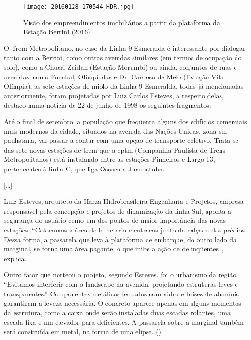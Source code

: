 \documentclass[11pt,fleqn]{book} %
\begin{document}
\begin{figure}[h]
	\caption{Visão dos empreendimentos imobiliários a partir da plataforma da Estação Berrini (2016)}
	\texttt{[image: 20160128\_170544\_HDR.jpg]}
\end{figure}

O Trem Metropolitano, no caso da Linha 9-Esmeralda é interessante por dialogar tanto com a Berrini, como outras avenidas similares (em termos de ocupação do solo), como a Chucri Zaidan (Estação Morumbi) ou ainda, conjuntos de ruas e avenidas, como Funchal, Olimpíadas e Dr. Cardoso de Melo (Estação Vila Olímpia), as sete estações do miolo da Linha 9-Esmeralda, todas já mencionadas anteriormente, foram projetadas por Luiz Carlos Esteves, a respeito delas, destaco numa notícia de 22 de junho de 1998 os seguintes fragmentos:

\begin{citacao}
	Até o final de setembro, a população que freqüenta alguns dos edifícios comerciais mais modernos da cidade, situados na avenida das Nações Unidas, zona sul paulistana, vai passar a contar com uma opção de transporte coletivo. Trata-se das sete novas estações de trem que a \gls{cptm} (Companhia Paulista de Trens Metropolitanos) está instalando entre as estações Pinheiros e Largo 13, pertencentes à linha C, que liga Osasco a Jurubatuba.
	
	[\dots]
	
	Luiz Esteves, arquiteto da Harza Hidrobrasileira Engenharia e Projetos, empresa responsável pela concepção e projetos de dinamização da linha Sul, aponta a segurança do usuário como um dos pontos de maior importância das novas estações. “Colocamos a área de bilheteria e catracas junto da calçada dos prédios. Dessa forma, a passarela que leva à plataforma de embarque, do outro lado da marginal, se torna uma área pagante, o que inibe a ação de delinqüentes”, explica.
	
	Outro fator que norteou o projeto, segundo Esteves, foi o urbanismo da região. “Evitamos interferir com o landscape da avenida, projetando estruturas leves e transparentes.” Componentes metálicos fechados com vidro e brises de alumínio garantiram a leveza necessária. O concreto aparece apenas em alguns momentos da estrutura, como a caixa onde serão instaladas duas escadas rolantes, uma escada fixa e um elevador para deficientes. A passarela sobre a marginal também será construída em metal, na forma de uma elipse.
	(\cite{trembom})
\end{citacao}
\end{document}
